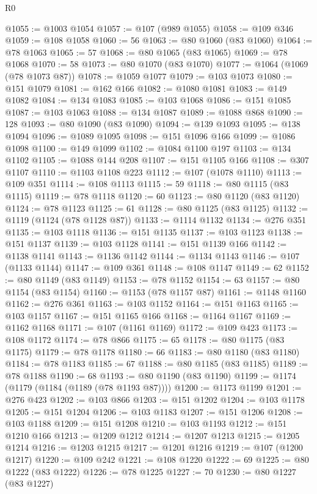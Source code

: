 \begin{lexlean}{R0}
\begin{coremodule}
@1055 := @1003 @1054
@1057 := @107 (@989 @1055)
@1058 := @109 @346
@1059 := @108 @1058
@1060 := 56
@1063 := @80 @1060 (@83 @1060)
@1064 := @78 @1063
@1065 := 57
@1068 := @80 @1065 (@83 @1065)
@1069 := @78 @1068
@1070 := 58
@1073 := @80 @1070 (@83 @1070)
@1077 := @1064 (@1069 (@78 @1073 @87))
@1078 := @1059 @1077
@1079 := @103 @1073
@1080 := @151 @1079
@1081 := @162 @166
@1082 := @1080 @1081
@1083 := @149 @1082
@1084 := @134 @1083
@1085 := @103 @1068
@1086 := @151 @1085
@1087 := @103 @1063
@1088 := @134 @1087
@1089 := @1088 @868
@1090 := 128
@1093 := @80 @1090 (@83 @1090)
@1094 := @139 @1093
@1095 := @138 @1094
@1096 := @1089 @1095
@1098 := @151 @1096 @166
@1099 := @1086 @1098
@1100 := @149 @1099
@1102 := @1084 @1100 @197
@1103 := @134 @1102
@1105 := @1088 @144 @208
@1107 := @151 @1105 @166
@1108 := @307 @1107
@1110 := @1103 @1108 @223
@1112 := @107 (@1078 @1110)
@1113 := @109 @351
@1114 := @108 @1113
@1115 := 59
@1118 := @80 @1115 (@83 @1115)
@1119 := @78 @1118
@1120 := 60
@1123 := @80 @1120 (@83 @1120)
@1124 := @78 @1123
@1125 := 61
@1128 := @80 @1125 (@83 @1125)
@1132 := @1119 (@1124 (@78 @1128 @87))
@1133 := @1114 @1132
@1134 := @276 @351
@1135 := @103 @1118
@1136 := @151 @1135
@1137 := @103 @1123
@1138 := @151 @1137
@1139 := @103 @1128
@1141 := @151 @1139 @166
@1142 := @1138 @1141
@1143 := @1136 @1142
@1144 := @1134 @1143
@1146 := @107 (@1133 @1144)
@1147 := @109 @361
@1148 := @108 @1147
@1149 := 62
@1152 := @80 @1149 (@83 @1149)
@1153 := @78 @1152
@1154 := 63
@1157 := @80 @1154 (@83 @1154)
@1160 := @1153 (@78 @1157 @87)
@1161 := @1148 @1160
@1162 := @276 @361
@1163 := @103 @1152
@1164 := @151 @1163
@1165 := @103 @1157
@1167 := @151 @1165 @166
@1168 := @1164 @1167
@1169 := @1162 @1168
@1171 := @107 (@1161 @1169)
@1172 := @109 @423
@1173 := @108 @1172
@1174 := @78 @866
@1175 := 65
@1178 := @80 @1175 (@83 @1175)
@1179 := @78 @1178
@1180 := 66
@1183 := @80 @1180 (@83 @1180)
@1184 := @78 @1183
@1185 := 67
@1188 := @80 @1185 (@83 @1185)
@1189 := @78 @1188
@1190 := 68
@1193 := @80 @1190 (@83 @1190)
@1199 := @1174 (@1179 (@1184 (@1189 (@78 @1193 @87))))
@1200 := @1173 @1199
@1201 := @276 @423
@1202 := @103 @866
@1203 := @151 @1202
@1204 := @103 @1178
@1205 := @151 @1204
@1206 := @103 @1183
@1207 := @151 @1206
@1208 := @103 @1188
@1209 := @151 @1208
@1210 := @103 @1193
@1212 := @151 @1210 @166
@1213 := @1209 @1212
@1214 := @1207 @1213
@1215 := @1205 @1214
@1216 := @1203 @1215
@1217 := @1201 @1216
@1219 := @107 (@1200 @1217)
@1220 := @109 @242
@1221 := @108 @1220
@1222 := 69
@1225 := @80 @1222 (@83 @1222)
@1226 := @78 @1225
@1227 := 70
@1230 := @80 @1227 (@83 @1227)

\end{coremodule}
\end{lexlean}
